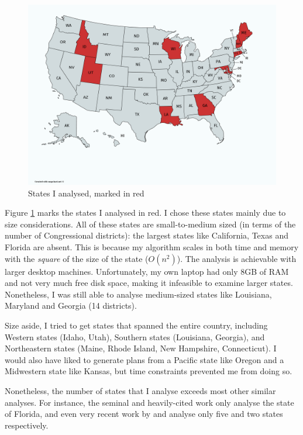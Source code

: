 \documentclass[]{article}
\begin{document}
\begin{figure}
\centering
\includegraphics{./img/states_analysed.png}
\caption{States I analysed, marked in red \label{states_analysed}}
\end{figure}

Figure \ref{states_analysed} marks the states I analysed in red. I chose
these states mainly due to size considerations. All of these states are
small-to-medium sized (in terms of the number of Congressional
districts): the largest states like California, Texas and Florida are
absent. This is because my algorithm scales in both time and memory with
the \emph{square} of the size of the state (\(O(n^2)\)). The analysis is
achievable with larger desktop machines. Unfortunately, my own laptop
had only 8GB of RAM and not very much free disk space, making it
infeasible to examine larger states. Nonetheless, I was still able to
analyse medium-sized states like Louisiana, Maryland and Georgia (14
districts).

Size aside, I tried to get states that spanned the entire country,
including Western states (Idaho, Utah), Southern states (Louisiana,
Georgia), and Northeastern states (Maine, Rhode Island, New Hampshire,
Connecticut). I would also have liked to generate plans from a Pacific
state like Oregon and a Midwestern state like Kansas, but time
constraints prevented me from doing so.

Nonetheless, the number of states that I analyse exceeds most other
similar analyses. For instance, the seminal and heavily-cited work
\cite{cr2013} only analyse the state of Florida, and even very recent
work by \cite{ddj2019recom} and \cite{s2020} analyse only five and two
states respectively.
\end{document}

